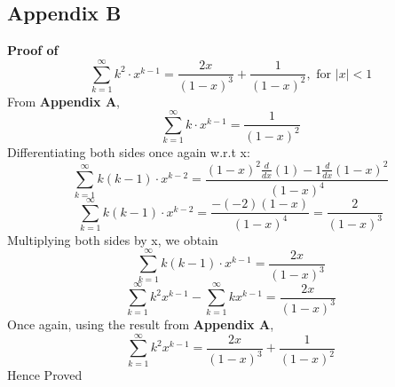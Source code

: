 \documentclass{article}
\begin{document}
\subsection*{Appendix B}
\textbf{Proof of} \[
    \sum_{k=1}^{\infty}k^2\cdot x^{k-1} = \frac{2x}{(1-x)^3} + \frac{1}{(1-x)^2}, \text{ for $|x| < 1$}
\]
From \textbf{Appendix A}, 
\[
    \sum_{k=1}^{\infty}k\cdot x^{k-1} = \frac{1}{(1-x)^2}
\]
Differentiating both sides once again w.r.t x:
\[
    \sum_{k=1}^{\infty}k(k-1)\cdot x^{k-2} = \frac{(1-x)^2\frac{d}{dx}(1) - 1 \frac{d}{dx}(1-x)^2}{(1-x)^4}
\]
\[
    \sum_{k=1}^{\infty}k(k-1)\cdot x^{k-2} = \frac{ -(-2)(1-x)}{(1-x)^4} = \frac{2}{(1-x)^3}
\]
Multiplying both sides by x, we obtain
\[
    \sum_{k=1}^{\infty}k(k-1)\cdot x^{k-1} = \frac{2x}{(1-x)^3}
\]
\[
    \sum_{k=1}^{\infty} k^2x^{k-1} - \sum_{k=1}^{\infty} kx^{k-1} = \frac{2x}{(1-x)^3}
\]
Once again, using the result from \textbf{Appendix A},
\[
    \sum_{k=1}^{\infty} k^2x^{k-1} = \frac{2x}{(1-x)^3} + \frac{1}{(1-x)^2}
\]
Hence Proved
\end{document}
